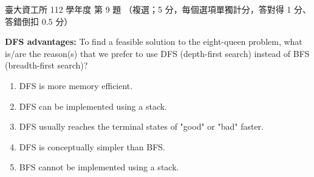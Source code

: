 \begin{pastexam}[label={px:ntu-112-dsa-09}]{臺大資工所 112 學年度 第 9 題}
（複選；5 分，每個選項單獨計分，答對得 1 分、答錯倒扣 0.5 分）

\textbf{DFS advantages:} To find a feasible solution to the eight-queen problem, what is/are the
reason(s) that we prefer to use DFS (depth-first search) instead of BFS (breadth-first search)?
\begin{enumerate}[label=(\Alph*)]
\item DFS is more memory efficient.
\item DFS can be implemented using a stack.
\item DFS usually reaches the terminal states of "good" or "bad" faster.
\item DFS is conceptually simpler than BFS.
\item BFS cannot be implemented using a stack.
\end{enumerate}
\end{pastexam}

